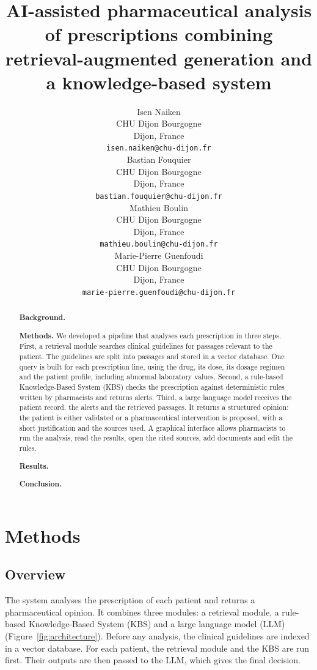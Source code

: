 \documentclass{article}
\title{AI-assisted pharmaceutical analysis of prescriptions combining retrieval-augmented generation and a knowledge-based system}
\author{
	Isen Naiken \\
	CHU Dijon Bourgogne \\
	Dijon, France \\
	\texttt{isen.naiken@chu-dijon.fr} \\
	\And
	Bastian Fouquier \\
	CHU Dijon Bourgogne \\
	Dijon, France \\
	\texttt{bastian.fouquier@chu-dijon.fr} \\
	\AND
	Mathieu Boulin \\
	CHU Dijon Bourgogne \\
	Dijon, France \\
	\texttt{mathieu.boulin@chu-dijon.fr} \\
	\And
	Marie-Pierre Guenfoudi \\
	CHU Dijon Bourgogne \\
	Dijon, France \\
	\texttt{marie-pierre.guenfoudi@chu-dijon.fr} \\
}
\begin{document}
\maketitle

\begin{abstract}
	\textbf{Background.} %

	\textbf{Methods.} We developed a pipeline that analyses each prescription in three steps. First, a retrieval module searches clinical guidelines for passages relevant to the patient. The guidelines are split into passages and stored in a vector database. One query is built for each prescription line, using the drug, its dose, its dosage regimen and the patient profile, including abnormal laboratory values. Second, a rule-based Knowledge-Based System (KBS) checks the prescription against deterministic rules written by pharmacists and returns alerts. Third, a large language model receives the patient record, the alerts and the retrieved passages. It returns a structured opinion: the patient is either validated or a pharmaceutical intervention is proposed, with a short justification and the sources used. A graphical interface allows pharmacists to run the analysis, read the results, open the cited sources, add documents and edit the rules.

	\textbf{Results.} %

	\textbf{Conclusion.} %
\end{abstract}





\section{Methods}
\label{sec:methods}

\subsection{Overview}

The system analyses the prescription of each patient and returns a pharmaceutical opinion. It combines three modules: a retrieval module, a rule-based Knowledge-Based System (KBS) and a large language model (LLM) (Figure~\ref{fig:architecture}). Before any analysis, the clinical guidelines are indexed in a vector database. For each patient, the retrieval module and the KBS are run first. Their outputs are then passed to the LLM, which gives the final decision.
\end{document}
